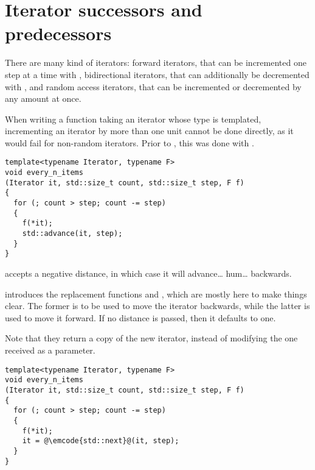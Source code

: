 \section{Iterator successors and predecessors}

There are many kind of iterators: forward iterators, that can be
incremented one step at a time with , bidirectional
iterators, that can additionally be decremented with
, and random access iterators, that can be
incremented or decremented by any amount at once.

When writing a function taking an iterator whose type is templated,
incrementing an iterator by more than one unit cannot be done
directly, as it would fail for non-random iterators. Prior to ,
this was done with .

\begin{lstlisting}
template<typename Iterator, typename F>
void every_n_items
(Iterator it, std::size_t count, std::size_t step, F f)
{
  for (; count > step; count -= step)
  {
    f(*it);
    std::advance(it, step);
  }
}
\end{lstlisting}

 accepts a negative distance, in which case it
will advance… hum… backwards.

 introduces the replacement functions  and
, which are mostly here to make things clear. The
former is to be used to move the iterator backwards, while the latter
is used to move it forward. If no distance is passed, then it defaults
to one.

Note that they return a copy of the new iterator, instead of modifying
the one received as a parameter.

\begin{lstlisting}
template<typename Iterator, typename F>
void every_n_items
(Iterator it, std::size_t count, std::size_t step, F f)
{
  for (; count > step; count -= step)
  {
    f(*it);
    it = @\emcode{std::next}@(it, step);
  }
}
\end{lstlisting}
